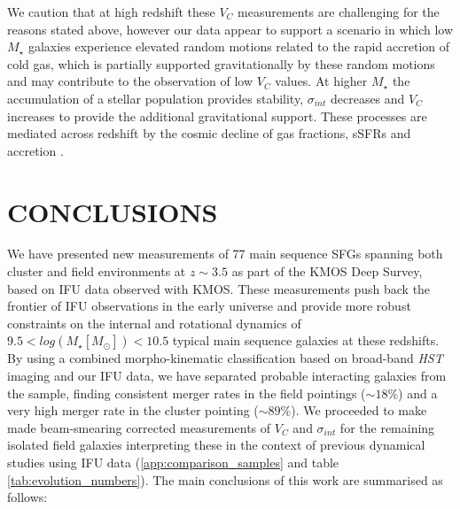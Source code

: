 \documentclass[fleqn,usenatbib]{mn2e}
\begin{document}
We caution that at high redshift these $V_{C}$ measurements are challenging for the reasons stated above, however our data appear to support a scenario in which low $M_{\star}$ galaxies experience elevated random motions related to the rapid accretion of cold gas, which is partially supported gravitationally by these random motions and may contribute to the observation of low $V_{C}$ values.
At higher $M_{\star}$ the accumulation of a stellar population provides stability, $\sigma_{int}$ decreases and $V_{C}$ increases to provide the additional gravitational support.
These processes are mediated across redshift by the cosmic decline of gas fractions, sSFRs and accretion \citep[e.g.][]{Wisnioski2015}. 

  
\section{CONCLUSIONS}\label{sec:conclusion}
We have presented new measurements of 77 main sequence SFGs spanning both cluster and field environments at $z\sim3.5$ as part of the KMOS Deep Survey, based on IFU data observed with KMOS.
These measurements push back the frontier of IFU observations in the early universe and provide more robust constraints on the internal and rotational dynamics of $9.5 < log(M_{\star}[M_{\odot}])< 10.5$ typical main sequence galaxies at these redshifts.
By using a combined morpho-kinematic classification based on broad-band {\em HST} imaging and our IFU data, we have separated probable interacting galaxies from the sample, finding consistent merger rates in the field pointings ($\sim18\%$) and a very high merger rate in the cluster pointing ($\sim89\%$).
We proceeded to make made beam-smearing corrected measurements of $V_{C}$ and $\sigma_{int}$ for the remaining isolated field galaxies interpreting these in the context of previous dynamical studies using IFU data (\cref{app:comparison_samples} and table \ref{tab:evolution_numbers}).
The main conclusions of this work are summarised as follows:
\end{document}
